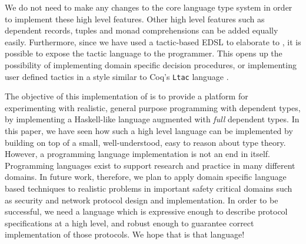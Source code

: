 We do not need to make any changes to the core language type system in order to 
implement these high level features. 
Other high level features such as dependent records, tuples and monad comprehensions
can be added equally easily.  Furthermore, 
since we have used a tactic-based EDSL to elaborate \Idris{} to \TT{}, it is
possible to expose the tactic language to the programmer. This opens up the
possibility of implementing domain specific decision procedures, or implementing
user defined tactics in a style similar to Coq's \texttt{Ltac} language \cite{Bertot2004}.

The objective of this implementation of \Idris{} is to provide a platform
for experimenting with realistic, general purpose programming with dependent
types, by implementing a Haskell-like language augmented with \emph{full}
dependent types.  
In this paper, we have seen how such a high level language can be implemented
by building on top of a small, well-understood, easy to reason about type
theory. However, a programming language implementation is not an end in itself. 
Programming languages exist to support research and practice in many different
domains. In future work, therefore, we plan to apply domain specific
language based techniques to realistic problems
in important safety critical domains such as security and network protocol
design and implementation. In order to be successful, we need a language which
is expressive enough to describe protocol specifications at a high level, and robust 
enough to guarantee correct implementation of those protocols. We hope that \Idris{}
is that language!




